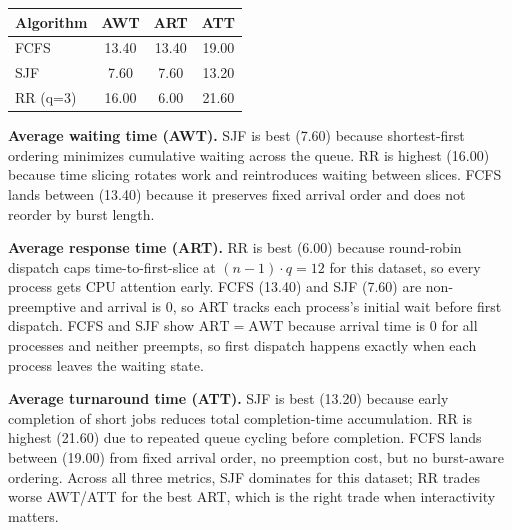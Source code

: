 \documentclass[12pt]{article}
\begin{document}
\begin{singlespace}
\begin{table}[H]
  \centering
  \begin{tabular}{@{}lccc@{}}
    \toprule
    \textbf{Algorithm} & \textbf{AWT} & \textbf{ART} & \textbf{ATT} \\
    \midrule
    FCFS     & 13.40 & 13.40 & 19.00 \\
    SJF      & 7.60  & 7.60  & 13.20 \\
    RR (q=3) & 16.00 & 6.00  & 21.60 \\
    \bottomrule
  \end{tabular}
\end{table}
\end{singlespace}

\noindent\textbf{Average waiting time (AWT).} SJF is best (7.60) because shortest-first ordering minimizes cumulative waiting across the queue. RR is highest (16.00) because time slicing rotates work and reintroduces waiting between slices. FCFS lands between (13.40) because it preserves fixed arrival order and does not reorder by burst length.

\noindent\textbf{Average response time (ART).} RR is best (6.00) because round-robin dispatch caps time-to-first-slice at $(n-1)\cdot q = 12$ for this dataset, so every process gets CPU attention early. FCFS (13.40) and SJF (7.60) are non-preemptive and arrival is 0, so ART tracks each process's initial wait before first dispatch.
FCFS and SJF show $\mathrm{ART}=\mathrm{AWT}$ because arrival time is 0 for all processes and neither preempts, so first dispatch happens exactly when each process leaves the waiting state.

\noindent\textbf{Average turnaround time (ATT).} SJF is best (13.20) because early completion of short jobs reduces total completion-time accumulation. RR is highest (21.60) due to repeated queue cycling before completion. FCFS lands between (19.00) from fixed arrival order, no preemption cost, but no burst-aware ordering.
Across all three metrics, SJF dominates for this dataset; RR trades worse AWT/ATT for the best ART, which is the right trade when interactivity matters.

\newpage


\end{document}
